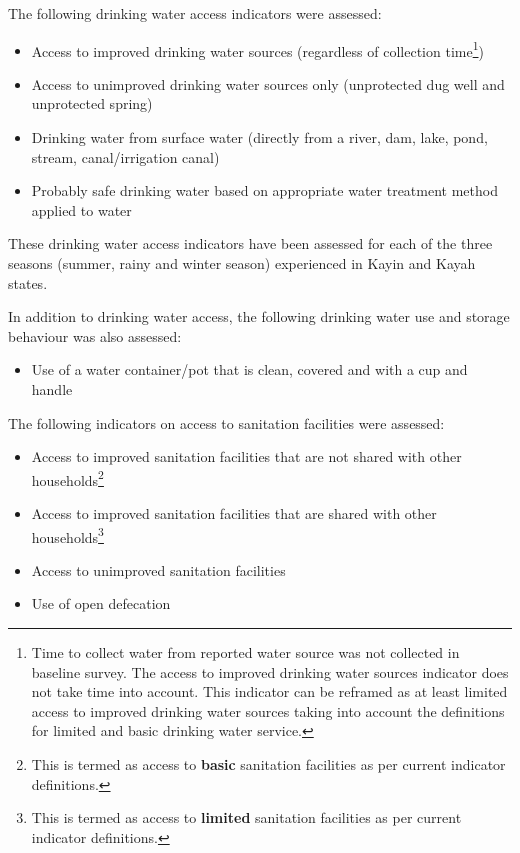 \documentclass[12pt,a4paper]{article}
\providecommand{\tightlist}{%
  \setlength{\itemsep}{0pt}\setlength{\parskip}{0pt}}
\let\rmarkdownfootnote\footnote%
\def\footnote{\protect\rmarkdownfootnote}
\begin{document}
The following drinking water access indicators were assessed:

\begin{itemize}
\item
  Access to improved drinking water sources (regardless of collection time\footnote{Time to collect water from reported water source was not collected in baseline survey. The access to improved drinking water sources indicator does not take time into account. This indicator can be reframed as at least limited access to improved drinking water sources taking into account the definitions for limited and basic drinking water service.})
\item
  Access to unimproved drinking water sources only (unprotected dug well and unprotected spring)
\item
  Drinking water from surface water (directly from a river, dam, lake, pond, stream, canal/irrigation canal)
\item
  Probably safe drinking water based on appropriate water treatment method applied to water
\end{itemize}

These drinking water access indicators have been assessed for each of the three seasons (summer, rainy and winter season) experienced in Kayin and Kayah states.

In addition to drinking water access, the following drinking water use and storage behaviour was also assessed:

\begin{itemize}
\tightlist
\item
  Use of a water container/pot that is clean, covered and with a cup and handle
\end{itemize}

The following indicators on access to sanitation facilities were assessed:

\begin{itemize}
\item
  Access to improved sanitation facilities that are not shared with other households\footnote{This is termed as access to \textbf{basic} sanitation facilities as per current indicator definitions.}
\item
  Access to improved sanitation facilities that are shared with other households\footnote{This is termed as access to \textbf{limited} sanitation facilities as per current indicator definitions.}
\item
  Access to unimproved sanitation facilities
\item
  Use of open defecation
\end{itemize}
\end{document}
